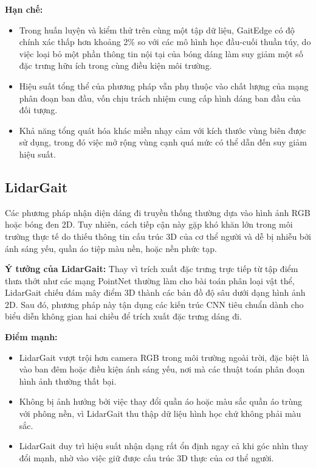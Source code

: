 \textbf{Hạn chế:}
\begin{itemize}
  \item Trong huấn luyện và kiểm thử trên cùng một tập dữ liệu, GaitEdge có độ chính xác thấp hơn khoảng 2\% so với các mô hình học đầu-cuối thuần túy, do việc loại bỏ một phần thông tin nội tại của bóng dáng làm suy giảm một số đặc trưng hữu ích trong cùng điều kiện môi trường.
  \item Hiệu suất tổng thể của phương pháp vẫn phụ thuộc vào chất lượng của mạng phân đoạn ban đầu, vốn chịu trách nhiệm cung cấp hình dáng ban đầu của đối tượng.
  \item Khả năng tổng quát hóa khác miền nhạy cảm với kích thước vùng biên được sử dụng, trong đó việc mở rộng vùng cạnh quá mức có thể dẫn đến suy giảm hiệu suất.
\end{itemize}



\subsection{LidarGait\cite{shen2023lidargaitbenchmarking3dgait}}

Các phương pháp nhận diện dáng đi truyền thống thường dựa vào hình ảnh RGB hoặc bóng đen 2D. Tuy nhiên, cách tiếp cận này gặp khó khăn lớn trong môi trường thực tế do thiếu thông tin cấu trúc 3D của cơ thể người và dễ bị nhiễu bởi ánh sáng yếu, quần áo tiệp màu nền, hoặc nền phức tạp.


\textbf{Ý tưởng của LidarGait:} Thay vì trích xuất đặc trưng trực tiếp từ tập điểm thưa thớt như các mạng PointNet thường làm cho bài toán phân loại vật thể, LidarGait chiếu đám mây điểm 3D thành các bản đồ độ sâu dưới dạng hình ảnh 2D. Sau đó, phương pháp này tận dụng các kiến trúc CNN tiêu chuẩn dành cho biểu diễn không gian hai chiều để trích xuất đặc trưng dáng đi.

\textbf{Điểm mạnh:}
\begin{itemize}
  \item LidarGait vượt trội hơn camera RGB trong môi trường ngoài trời, đặc biệt là vào ban đêm hoặc điều kiện ánh sáng yếu, nơi mà các thuật toán phân đoạn hình ảnh thường thất bại.
  \item Không bị ảnh hưởng bởi việc thay đổi quần áo hoặc màu sắc quần áo trùng với phông nền, vì LidarGait thu thập dữ liệu hình học chứ không phải màu sắc.
  \item LidarGait duy trì hiệu suất nhận dạng rất ổn định ngay cả khi góc nhìn thay đổi mạnh, nhờ vào việc giữ được cấu trúc 3D thực của cơ thể người.
\end{itemize}

